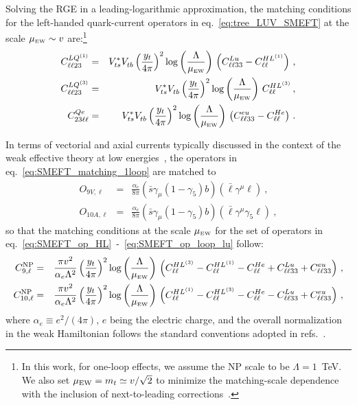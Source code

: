 Solving the RGE in  a leading-logarithmic approximation, the matching conditions for the left-handed quark-current operators in eq.~\eqref{eq:tree_LUV_SMEFT} at the scale $\mu_{\textrm{\tiny{EW}}}\sim v $ are:\footnote{In this work, for one-loop effects,  we assume the NP scale to be $\Lambda = 1$~TeV. We also set $\mu_{\rm EW} = m_t\simeq v/\sqrt{2}$ to minimize the matching-scale dependence with the inclusion of next-to-leading corrections~\cite{Aebischer:2015fzz,Bobeth:2017xry}.}
\begin{eqnarray}
	\label{eq:SMEFT_matching_1loop}
	C^{LQ^{(1)}}_{\ell \ell 23} &=& V_{ts}^{*} V^{ }_{tb} \left(\frac{y_{t} }{4 \pi}\right)^2 \log \left( \frac{\Lambda}{\mu_{\textrm{\tiny{EW}}}} \right)   \, \left(C^{Lu}_{\ell \ell 3 3} - C^{HL^{(1)}}_{\ell \ell} \right)\,,\nonumber \\
	C^{LQ^{(3)}}_{\ell \ell 23} &=& V_{ts}^{*} V^{ }_{tb} \left(\frac{y_{t} }{4 \pi}\right)^2 \log \left( \frac{\Lambda}{\mu_{\textrm{\tiny{EW}}}} \right)   \,   C^{HL^{(3)}}_{\ell \ell} \,,\nonumber \\
	C^{Qe}_{23\ell \ell} &=& V_{ts}^{*} V^{ }_{tb} \left(\frac{y_{t} }{4 \pi}\right)^2 \log \left( \frac{\Lambda}{\mu_{\textrm{\tiny{EW}}}} \right)   \, \left( C^{eu}_{\ell \ell 3 3} - C_{\ell \ell}^{He}\right) \, .
\end{eqnarray}

In terms of vectorial and axial currents typically discussed in the context of the weak effective theory at low energies~\cite{Buchalla:1995vs,Buras:1998raa,Silvestrini:2019sey}, the operators in eq.~\eqref{eq:SMEFT_matching_1loop} are matched to
\begin{eqnarray}
	\label{eq:_Q9_Q10}
	O_{9 V, \ell} & = & \frac{\alpha_{e}}{8 \pi} (\bar{s} \gamma_{\mu} (1-\gamma_{5})b) ( \bar{\ell} \gamma^{\mu} \ell ) \nonumber \ , \ \\
	O_{10 A, \ell} & = & \frac{\alpha_{e}}{8 \pi} (\bar{s} \gamma_{\mu} (1-\gamma_{5})b) ( \bar{\ell} \gamma^{\mu} \gamma_{5} \ell ) \ ,
\end{eqnarray}
so that the matching conditions at the scale $\mu_{\textrm{\tiny{EW}}}$ for the set of operators in eq.~\eqref{eq:SMEFT_op_HL}~-~\eqref{eq:SMEFT_op_loop_lu} follow:
\begin{eqnarray} 
	\label{eq:_C9_C10}
	C_{9,\ell}^{\rm NP}&=& \frac{\pi v^{2}}{\alpha_{e} \Lambda^2} \left(\frac{y_{t} }{4 \pi}\right)^2 \log \left( \frac{\Lambda}{\mu_{\textrm{\tiny{EW}}}} \right)   \, \left(C^{HL^{(3)}}_{\ell \ell} - C^{HL^{(1)}}_{\ell \ell} -C^{He}_{\ell \ell} + C^{Lu}_{\ell \ell 3 3} + C^{eu}_{\ell \ell 3 3} \right)\,,\nonumber \\
	C_{10,\ell}^{\rm NP}&=& \frac{\pi v^{2}}{\alpha_{e} \Lambda^2} \left(\frac{y_{t} }{4 \pi}\right)^2 \log \left( \frac{\Lambda}{\mu_{\textrm{\tiny{EW}}}} \right)   \, \left(C^{HL^{(1)}}_{\ell \ell} - C^{HL^{(3)}}_{\ell \ell} -C^{He}_{\ell \ell} - C^{Lu}_{\ell \ell 3 3} + C^{eu}_{\ell \ell 3 3} \right)\, ,
\end{eqnarray} 
where $\alpha_{e}\equiv e^2/(4 \pi)$, $e$ being the electric charge, and the overall normalization in the weak Hamiltonian follows the standard conventions adopted in refs.~\cite{Ciuchini:2015qxb,Ciuchini:2017mik,Ciuchini:2019usw}.

